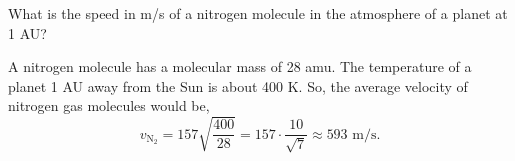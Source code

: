 \documentclass[../astro_4]{subfiles}
\begin{document}
\begin{problem}
What is the speed in m/s of a nitrogen molecule in the atmosphere of a planet at 1 AU?
\end{problem}
A nitrogen molecule has a molecular mass of 28 amu.
The temperature of a planet 1 AU away from the Sun is about 400 K.
So, the average velocity of nitrogen gas molecules would be, \[
	v_{\text{N}_2}=157\sqrt{\frac{400}{28}}=157\cdot \frac{10}{\sqrt{7} }\approx 593 \text{ m/s}
	.\]
\end{document}
